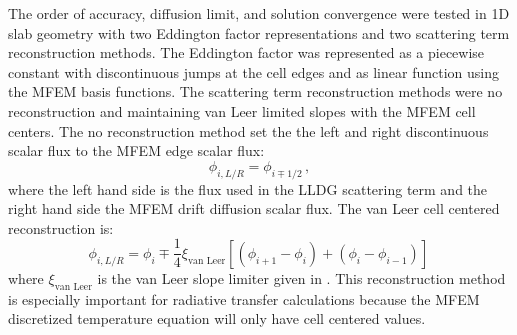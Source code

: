 
The order of accuracy, diffusion limit, and solution convergence were tested in 1D slab geometry with two Eddington factor representations and two scattering term reconstruction methods. The Eddington factor was represented as a piecewise constant with discontinuous jumps at the cell edges and as linear function using the MFEM basis functions. The scattering term reconstruction methods were no reconstruction and maintaining van Leer limited slopes with the MFEM cell centers. The no reconstruction method set the the left and right discontinuous scalar flux to the MFEM edge scalar flux:
	\begin{equation} 
		\phi_{i,L/R} = \phi_{i\mp1/2} \,,
	\end{equation}
where the left hand side is the flux used in the LLDG scattering term and the right hand side the MFEM drift diffusion scalar flux. 
The van Leer cell centered reconstruction is: 
	\begin{equation} \label{eq:vanLeer}
		\phi_{i,L/R} = \phi_i \mp \frac{1}{4} \xi_\text{van Leer} \left[ \left(\phi_{i+1} - \phi_{i}\right) + 
			\left(\phi_{i} - \phi_{i-1}\right)\right] \,
	\end{equation}
where $\xi_\text{van Leer}$ is the van Leer slope limiter given in \cite{}. This reconstruction method is especially important for radiative transfer calculations because the MFEM discretized temperature equation will only have cell centered values. 

